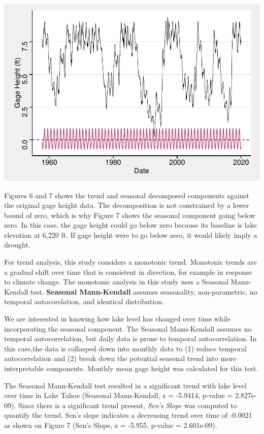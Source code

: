 \documentclass[12pt,]{article}
\let\origfigure\figure
\let\endorigfigure\endfigure
\renewenvironment{figure}[1][2] {
    \expandafter\origfigure\expandafter[H]
} {
    \endorigfigure
}
\begin{document}
\begin{figure}
\centering
\includegraphics{Shintaku_ENV872_Project_files/figure-latex/unnamed-chunk-9-1.pdf}
\caption{Seasonal Component Against Actual Data}
\end{figure}

Figures 6 and 7 shows the trend and seasonal decomposed components
against the original gage height data. The decomposition is not
constrained by a lower bound of zero, which is why Figure 7 shows the
seasonal component going below zero. In this case, the gage height could
go below zero because its baseline is lake elevation at 6,220 ft. If
gage height were to go below zero, it would likely imply a drought.

For trend analysis, this study considers a monotonic trend. Monotonic
trends are a gradual shift over time that is consistent in direction,
for example in response to climate change. The monotonic analysis in
this study uses a Seasonal Mann-Kendall test. \textbf{Seasonal
Mann-Kendall} assumes seasonality, non-parametric, no temporal
autocorelation, and identical distribution.

We are interested in knowing how lake level has changed over time while
incorporating the seasonal component. The Seasonal Mann-Kendall assumes
no temporal autocorrelation, but daily data is prone to temporal
autocorrelation. In this case,the data is collasped down into monthly
data to (1) reduce temporal autocorrelation and (2) break down the
potential seasonal trend into more interpretable components. Monthly
mean gage height was calculated for this test.

The Seasonal Mann-Kendall test resulted in a significant trend with lake
level over time in Lake Tahoe (Seasonal Mann-Kendall, z = -5.9414,
p-value = 2.827e-09). Since there is a significant trend present,
\emph{Sen's Slope} was computed to quantify the trend. Sen's slope
indicates a decreasing trend over time of -0.0021 as shown on Figure 7
(Sen's Slope, z = -5.955, p-value = 2.601e-09).
\end{document}
